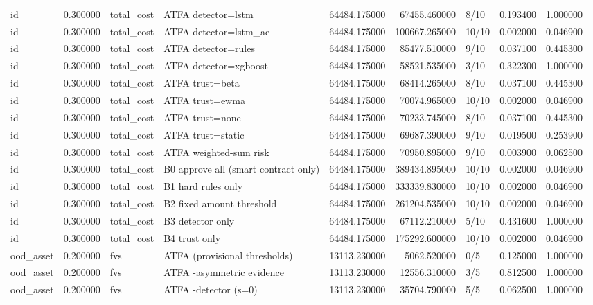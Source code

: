 \begin{tabular}{lrllrrlrr}
id & 0.300000 & total\_cost & ATFA detector=lstm & 64484.175000 & 67455.460000 & 8/10 & 0.193400 & 1.000000 \\
id & 0.300000 & total\_cost & ATFA detector=lstm\_ae & 64484.175000 & 100667.265000 & 10/10 & 0.002000 & 0.046900 \\
id & 0.300000 & total\_cost & ATFA detector=rules & 64484.175000 & 85477.510000 & 9/10 & 0.037100 & 0.445300 \\
id & 0.300000 & total\_cost & ATFA detector=xgboost & 64484.175000 & 58521.535000 & 3/10 & 0.322300 & 1.000000 \\
id & 0.300000 & total\_cost & ATFA trust=beta & 64484.175000 & 68414.265000 & 8/10 & 0.037100 & 0.445300 \\
id & 0.300000 & total\_cost & ATFA trust=ewma & 64484.175000 & 70074.965000 & 10/10 & 0.002000 & 0.046900 \\
id & 0.300000 & total\_cost & ATFA trust=none & 64484.175000 & 70233.745000 & 8/10 & 0.037100 & 0.445300 \\
id & 0.300000 & total\_cost & ATFA trust=static & 64484.175000 & 69687.390000 & 9/10 & 0.019500 & 0.253900 \\
id & 0.300000 & total\_cost & ATFA weighted-sum risk & 64484.175000 & 70950.895000 & 9/10 & 0.003900 & 0.062500 \\
id & 0.300000 & total\_cost & B0 approve all (smart contract only) & 64484.175000 & 389434.895000 & 10/10 & 0.002000 & 0.046900 \\
id & 0.300000 & total\_cost & B1 hard rules only & 64484.175000 & 333339.830000 & 10/10 & 0.002000 & 0.046900 \\
id & 0.300000 & total\_cost & B2 fixed amount threshold & 64484.175000 & 261204.535000 & 10/10 & 0.002000 & 0.046900 \\
id & 0.300000 & total\_cost & B3 detector only & 64484.175000 & 67112.210000 & 5/10 & 0.431600 & 1.000000 \\
id & 0.300000 & total\_cost & B4 trust only & 64484.175000 & 175292.600000 & 10/10 & 0.002000 & 0.046900 \\
ood\_asset & 0.200000 & fvs & ATFA (provisional thresholds) & 13113.230000 & 5062.520000 & 0/5 & 0.125000 & 1.000000 \\
ood\_asset & 0.200000 & fvs & ATFA -asymmetric evidence & 13113.230000 & 12556.310000 & 3/5 & 0.812500 & 1.000000 \\
ood\_asset & 0.200000 & fvs & ATFA -detector (s=0) & 13113.230000 & 35704.790000 & 5/5 & 0.062500 & 1.000000 \\

\end{tabular}
